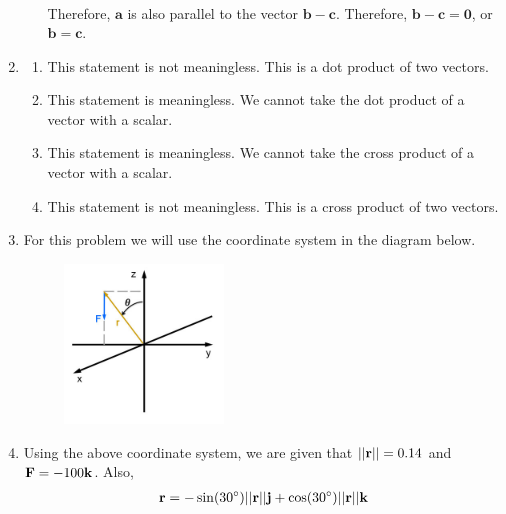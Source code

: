 \documentclass{article}
\begin{document}
\begin{enumerate}
\begin{enumerate}
\begin{align*}
\end{align*}
Therefore, $\mathbf{a}$ is also parallel to the vector $\mathbf{b} - \mathbf{c}$. Therefore, $\mathbf{b} - \mathbf{c} = \mathbf{0}$, or $\mathbf{b} = \mathbf{c}$.
\end{enumerate}
\item
\begin{enumerate}
\item This statement is not meaningless. This is a dot product of two vectors.
\item This statement is meaningless. We cannot take the dot product of a vector with a scalar. 
\item This statement is meaningless. We cannot take the cross product of a vector with a scalar. 
\item This statement is not meaningless. This is a cross product of two vectors.
\end{enumerate}
\item
For this problem we will use the coordinate system in the diagram below. 
\begin{figure}[!htbp]
  \begin{center}
    \includegraphics[width=0.4\textwidth]{WA01TorqueSol.jpg}
  \end{center}
\end{figure}
\BEN
\item Using the above coordinate system, we are given that $||\mathbf{r}|| = 0.14$ and $\mathbf{F} = -100\mathbf{k}$. Also, 
\begin{align*}
  \MB{r} &=- \sin(30^{\circ})||\MB{r}||\MB{j} + \cos(30^{\circ} )||\MB{r}||\MB{k}\\

\end{align*}
\end{enumerate}
\end{document}
